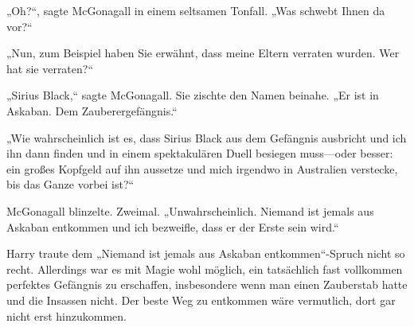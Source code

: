 „Oh?“, sagte McGonagall in einem seltsamen Tonfall. „Was schwebt Ihnen da vor?“

„Nun, zum Beispiel haben Sie erwähnt, dass meine Eltern verraten wurden. Wer hat sie verraten?“

„Sirius Black,“ sagte McGonagall. Sie zischte den Namen beinahe. „Er ist in Askaban. Dem Zauberergefängnis.“

„Wie wahrscheinlich ist es, dass Sirius Black aus dem Gefängnis ausbricht und ich ihn dann finden und in einem spektakulären Duell besiegen muss—oder besser: ein großes Kopfgeld auf ihn aussetze und mich irgendwo in Australien verstecke, bis das Ganze vorbei ist?“

McGonagall blinzelte. Zweimal. „Unwahrscheinlich. Niemand ist jemals aus Askaban entkommen und ich bezweifle, dass er der Erste sein wird.“

Harry traute dem „Niemand ist jemals aus Askaban entkommen“-Spruch nicht so recht. Allerdings war es mit Magie wohl möglich, ein tatsächlich fast vollkommen perfektes Gefängnis zu erschaffen, insbesondere wenn man einen Zauberstab hatte und die Insassen nicht. Der beste Weg zu entkommen wäre vermutlich, dort gar nicht erst hinzukommen.

